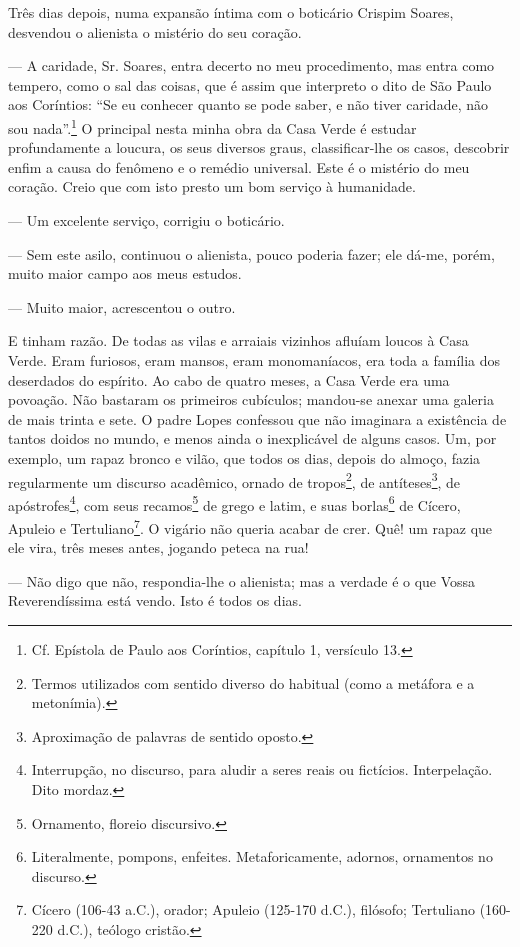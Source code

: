 Três dias depois, numa expansão íntima com o boticário Crispim Soares,
desvendou o alienista o mistério do seu coração.

--- A caridade, Sr. Soares, entra decerto no meu procedimento, mas entra
como tempero, como o sal das coisas, que é assim que interpreto o dito
de São Paulo aos Coríntios: ``Se eu conhecer quanto se pode saber, e não
tiver caridade, não sou nada''.\footnote{Cf. Epístola de Paulo aos
  Coríntios, capítulo 1, versículo 13.} O principal nesta minha obra da
Casa Verde é estudar profundamente a loucura, os seus diversos graus,
classificar-lhe os casos, descobrir enfim a causa do fenômeno e o
remédio universal. Este é o mistério do meu coração. Creio que com isto
presto um bom serviço à humanidade.

--- Um excelente serviço, corrigiu o boticário.

--- Sem este asilo, continuou o alienista, pouco poderia fazer; ele
dá-me, porém, muito maior campo aos meus estudos.

--- Muito maior, acrescentou o outro.

E tinham razão. De todas as vilas e arraiais vizinhos afluíam loucos à
Casa Verde. Eram furiosos, eram mansos, eram monomaníacos, era toda a
família dos deserdados do espírito. Ao cabo de quatro meses, a Casa
Verde era uma povoação. Não bastaram os primeiros cubículos; mandou-se
anexar uma galeria de mais trinta e sete. O padre Lopes confessou que
não imaginara a existência de tantos doidos no mundo, e menos ainda o
inexplicável de alguns casos. Um, por exemplo, um rapaz bronco e vilão,
que todos os dias, depois do almoço, fazia regularmente um discurso
acadêmico, ornado de tropos\footnote{Termos utilizados com sentido
  diverso do habitual (como a metáfora e a metonímia).}, de
antíteses\footnote{Aproximação de palavras de sentido oposto.}, de
apóstrofes\footnote{Interrupção, no discurso, para aludir a seres reais
  ou fictícios. Interpelação. Dito mordaz.}, com seus recamos\footnote{Ornamento,
  floreio discursivo.} de grego e latim, e suas borlas\footnote{Literalmente,
  pompons, enfeites. Metaforicamente, adornos, ornamentos no discurso.}
de Cícero, Apuleio e Tertuliano\footnote{Cícero (106-43 a.C.), orador;
  Apuleio (125-170 d.C.), filósofo; Tertuliano (160-220 d.C.), teólogo
  cristão.}. O vigário não queria acabar de crer. Quê! um rapaz que ele
vira, três meses antes, jogando peteca na rua!

--- Não digo que não, respondia-lhe o alienista; mas a verdade é o que
Vossa Reverendíssima está vendo. Isto é todos os dias.

